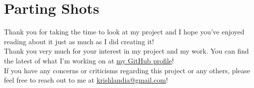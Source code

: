 
\section{Parting Shots}

Thank you for taking the time to look at my project and I hope you've enjoyed reading about it just as much as I did creating it! \\ 

Thank you very much for your interest in my project and my work. You can find the latest of what I'm working on at \href{https://github.com/isobarbaric/}{my GitHub profile}! \\

If you have any concerns or criticisms regarding this project or any others, please feel free to reach out to me at \href{mailto:krishlandia@gmail.com}{krishlandia@gmail.com}! 